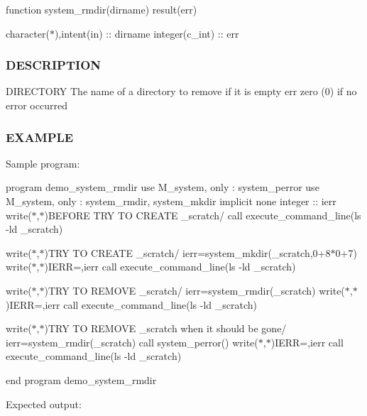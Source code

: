 function system\+\_\+rmdir(dirname) result(err)

character($\ast$),intent(in) \+:\+: dirname integer(c\+\_\+int) \+:\+: err \subsubsection*{D\+E\+S\+C\+R\+I\+P\+T\+I\+ON}

D\+I\+R\+E\+C\+T\+O\+RY The name of a directory to remove if it is empty err zero (0) if no error occurred \subsubsection*{E\+X\+A\+M\+P\+LE}

Sample program\+:

program demo\+\_\+system\+\_\+rmdir use M\+\_\+system, only \+: system\+\_\+perror use M\+\_\+system, only \+: system\+\_\+rmdir, system\+\_\+mkdir implicit none integer \+:\+: ierr write($\ast$,$\ast$)\textquotesingle{}B\+E\+F\+O\+RE T\+RY TO C\+R\+E\+A\+TE \+\_\+scratch/\textquotesingle{} call execute\+\_\+command\+\_\+line(\textquotesingle{}ls -\/ld \+\_\+scratch\textquotesingle{})

write($\ast$,$\ast$)\textquotesingle{}T\+RY TO C\+R\+E\+A\+TE \+\_\+scratch/\textquotesingle{} ierr=system\+\_\+mkdir(\textquotesingle{}\+\_\+scratch\textquotesingle{},0+8$\ast$0+7) write($\ast$,$\ast$)\textquotesingle{}I\+E\+RR=\textquotesingle{},ierr call execute\+\_\+command\+\_\+line(\textquotesingle{}ls -\/ld \+\_\+scratch\textquotesingle{})

write($\ast$,$\ast$)\textquotesingle{}T\+RY TO R\+E\+M\+O\+VE \+\_\+scratch/\textquotesingle{} ierr=system\+\_\+rmdir(\textquotesingle{}\+\_\+scratch\textquotesingle{}) write($\ast$,$\ast$)\textquotesingle{}I\+E\+RR=\textquotesingle{},ierr call execute\+\_\+command\+\_\+line(\textquotesingle{}ls -\/ld \+\_\+scratch\textquotesingle{})

write($\ast$,$\ast$)\textquotesingle{}T\+RY TO R\+E\+M\+O\+VE \+\_\+scratch when it should be gone/\textquotesingle{} ierr=system\+\_\+rmdir(\textquotesingle{}\+\_\+scratch\textquotesingle{}) call system\+\_\+perror(\textquotesingle{}) write($\ast$,$\ast$)\textquotesingle{}I\+E\+RR=\textquotesingle{},ierr call execute\+\_\+command\+\_\+line(\textquotesingle{}ls -\/ld \+\_\+scratch\textquotesingle{})

end program demo\+\_\+system\+\_\+rmdir

Expected output\+: 

